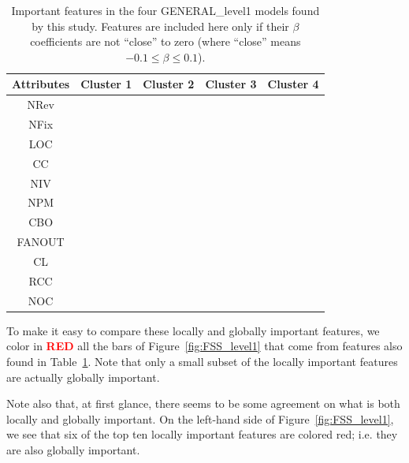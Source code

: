 \documentclass[10pt,journal,compsoc]{IEEEtran}
\newcommand{\fig}[1]{Figure~\ref{fig:#1}}
\newcommand{\bluecheck}{}%
\DeclareRobustCommand{\bluecheck}{%
  \tikz\fill[scale=0.4, color=blue]
  (0,.35) -- (.25,0) -- (1,.7) -- (.25,.15) -- cycle;%
}
\begin{document}
\begin{table}[!t]
\centering
\begin{tabular}{|c|c|c|c|c|}
\hline
\rowcolor[HTML]{C0C0C0} 
Attributes & Cluster 1 & Cluster 2 & Cluster 3 & Cluster 4 \\ \hline
NRev       & \bluecheck         &           &           &           \\ \hline
NFix       &           & \bluecheck         &           &           \\ \hline
LOC        & \bluecheck         & \bluecheck         &           &           \\ \hline
CC         & \bluecheck         &           &           &           \\ \hline
NIV        & \bluecheck         &           & \bluecheck         &           \\ \hline
NPM        & \bluecheck         &           & \bluecheck         &           \\ \hline
CBO        &           & \bluecheck         &           &           \\ \hline
FANOUT     &           &           & \bluecheck         &           \\ \hline
CL         &           &           & \bluecheck         & \bluecheck         \\ \hline
RCC        &           &           &           & \bluecheck         \\ \hline
NOC        &           &           & \bluecheck         & \bluecheck         \\ \hline
\end{tabular}
\caption{Important features in the four   GENERAL\_level1 models found by this study. 
Features are included here only if
their $\beta$ coefficients  are   not   ``close'' to zero (where ``close'' means $-0.1 \le \beta \le 0.1$).}
\label{tbl:coefs_4}
\end{table}

To make it easy to compare these locally and globally important features,  we color in \textcolor{red}{{\bf RED}}
all the bars of \fig{FSS_level1} that come from features
also found in  Table~\ref{tbl:coefs_4}. Note that only a small subset of the locally important
features are actually globally important.

Note also that, at first glance, there  seems to be some agreement on what is both locally and globally important. On the left-hand side of  \fig{FSS_level1}, we see that six of the top ten locally important features are colored red; i.e. they are also globally important. 
\end{document}
